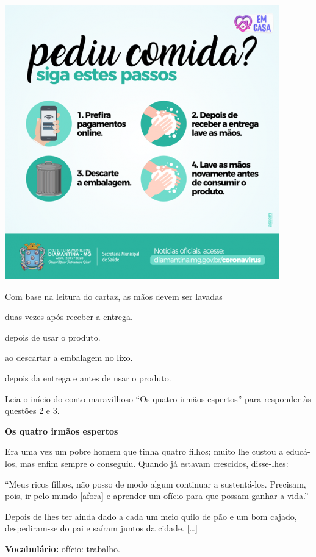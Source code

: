 \includegraphics[width=4.68750in,height=4.68750in]{./media/image36.png}

Com base na leitura do cartaz, as mãos devem ser lavadas

\begin{escolha}
\item duas vezes após receber a entrega.

\item depois de usar o produto.

\item ao descartar a embalagem no lixo.

\item depois da entrega e antes de usar o produto.
\end{escolha}



Leia o início do conto maravilhoso ``Os quatro irmãos espertos'' para responder às questões 2 e 3.

\begin{myquote}
\textbf{Os quatro irmãos espertos}

Era uma vez um pobre homem que tinha quatro filhos; muito lhe custou a
educá-los, mas enfim sempre o conseguiu. Quando já estavam crescidos,
disse-lhes:

``Meus ricos filhos, não posso de modo algum continuar a sustentá-los.
Precisam, pois, ir pelo mundo [afora] e aprender um ofício para que possam
ganhar a vida.''

Depois de lhes ter ainda dado a cada um meio quilo de pão e um bom
cajado, despediram-se do pai e saíram juntos da cidade. {[}\ldots{}{]}


\textbf{Vocabulário:} ofício: trabalho.
\end{myquote}

